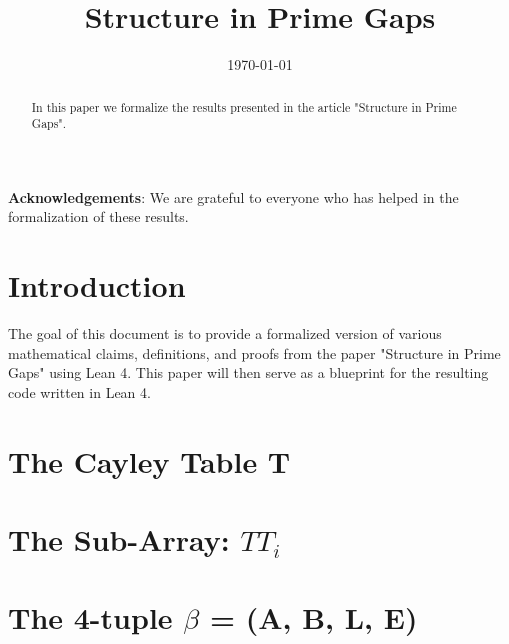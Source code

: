 %

\title{Structure in Prime Gaps}

\date{\today}

\begin{abstract}
In this paper we formalize the results presented in the article "Structure in Prime Gaps".
\end{abstract}

\maketitle

\tableofcontents

\textbf{Acknowledgements}: We are grateful to everyone who has helped in the formalization of these results. 

\chapter{Introduction}
The goal of this document is to provide a formalized version of various mathematical claims, definitions, and proofs from the paper "Structure in Prime Gaps" using Lean 4. This paper will then serve as a blueprint for the resulting code written in Lean 4.

\chapter{The Cayley Table T}

\chapter{The Sub-Array: $TT_i$}


\chapter{The 4-tuple $\beta$ = (A, B, L, E)}

